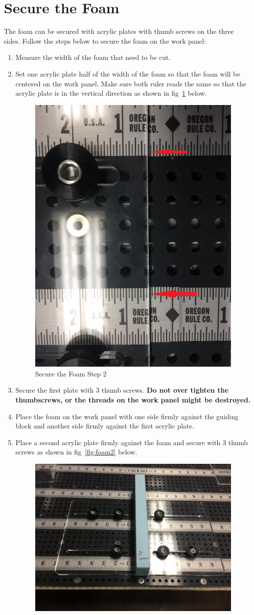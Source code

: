 \documentclass[titlepage,12pt,letter]{report}
\numberwithin{equation}{chapter}
\begin{document}
\section{Secure the Foam}
The foam can be secured with acrylic plates with thumb screws on the three sides. Follow the steps below to secure the foam on the work panel:
\begin{enumerate}[noitemsep,topsep=0pt]
	\item Measure the width of the foam that need to be cut.
	\item Set one acrylic plate half of the width of the foam so that the foam will be centered on the work panel. Make sure both ruler reads the same so that the acrylic plate is in the vertical direction as shown in fig~\ref{fig:foam1} below.
	\begin{figure} [H]
		\includegraphics[width = 0.45\linewidth]{./Figures/secure_foam/1.jpg}
		\caption{Secure the Foam Step 2}
		\label{fig:foam1}
	\end{figure}
	\item Secure the first plate with 3 thumb screws. \textbf{Do not over tighten the thumbscrews, or the threads on the work panel might be destroyed.}
	\item Place the foam on the work panel with one side firmly against the guiding block and another side firmly against the first acrylic plate.
	\item Place a second acrylic plate firmly against the foam and secure with 3 thumb screws as shown in fig~\ref{fig:foam2} below.
	\begin{figure} [H]
		\includegraphics[width = 0.6\linewidth]{./Figures/secure_foam/2.jpg}

\end{figure}
\end{enumerate}
\end{document}
